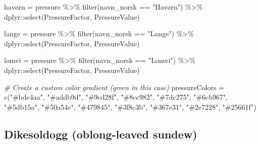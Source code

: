 \documentclass[
]{book}
\newenvironment{Shaded}{\begin{snugshade}}{\end{snugshade}}
\newcommand{\AttributeTok}[1]{\textcolor[rgb]{0.77,0.63,0.00}{#1}}
\newcommand{\CommentTok}[1]{\textcolor[rgb]{0.56,0.35,0.01}{\textit{#1}}}
\newcommand{\ConstantTok}[1]{\textcolor[rgb]{0.00,0.00,0.00}{#1}}
\newcommand{\DecValTok}[1]{\textcolor[rgb]{0.00,0.00,0.81}{#1}}
\newcommand{\FloatTok}[1]{\textcolor[rgb]{0.00,0.00,0.81}{#1}}
\newcommand{\FunctionTok}[1]{\textcolor[rgb]{0.00,0.00,0.00}{#1}}
\newcommand{\NormalTok}[1]{#1}
\newcommand{\OtherTok}[1]{\textcolor[rgb]{0.56,0.35,0.01}{#1}}
\newcommand{\SpecialCharTok}[1]{\textcolor[rgb]{0.00,0.00,0.00}{#1}}
\newcommand{\StringTok}[1]{\textcolor[rgb]{0.31,0.60,0.02}{#1}}
\begin{document}
\begin{Shaded}
\begin{Highlighting}[]
\NormalTok{havørn }\OtherTok{=}\NormalTok{ pressure }\SpecialCharTok{\%\textgreater{}\%} \FunctionTok{filter}\NormalTok{(navn\_norsk }\SpecialCharTok{==} \StringTok{"Havørn"}\NormalTok{) }\SpecialCharTok{\%\textgreater{}\%}\NormalTok{ dplyr}\SpecialCharTok{::}\FunctionTok{select}\NormalTok{(PressureFactor, PressureValue)}

\NormalTok{lange }\OtherTok{=}\NormalTok{ pressure }\SpecialCharTok{\%\textgreater{}\%} \FunctionTok{filter}\NormalTok{(navn\_norsk }\SpecialCharTok{==} \StringTok{"Lange"}\NormalTok{) }\SpecialCharTok{\%\textgreater{}\%}\NormalTok{ dplyr}\SpecialCharTok{::}\FunctionTok{select}\NormalTok{(PressureFactor, PressureValue)}

\NormalTok{lomvi }\OtherTok{=}\NormalTok{ pressure }\SpecialCharTok{\%\textgreater{}\%} \FunctionTok{filter}\NormalTok{(navn\_norsk }\SpecialCharTok{==} \StringTok{"Lomvi"}\NormalTok{) }\SpecialCharTok{\%\textgreater{}\%}\NormalTok{ dplyr}\SpecialCharTok{::}\FunctionTok{select}\NormalTok{(PressureFactor, PressureValue)}

\CommentTok{\# Create a custom color gradient (green in this case)}
\NormalTok{pressureColors }\OtherTok{=} \FunctionTok{c}\NormalTok{(}\StringTok{"\#bde4aa"}\NormalTok{, }\StringTok{"\#addb9d"}\NormalTok{, }\StringTok{"\#9cd28f"}\NormalTok{, }\StringTok{"\#8cc982"}\NormalTok{, }\StringTok{"\#7dc275"}\NormalTok{, }\StringTok{"\#6cb967"}\NormalTok{, }\StringTok{"\#5db15a"}\NormalTok{, }\StringTok{"\#50a54e"}\NormalTok{, }\StringTok{"\#479845"}\NormalTok{, }\StringTok{"\#3f8c3b"}\NormalTok{, }\StringTok{"\#367e31"}\NormalTok{, }\StringTok{"\#2e7228"}\NormalTok{, }\StringTok{"\#25661f"}\NormalTok{) }
\end{Highlighting}
\end{Shaded}

\hypertarget{dikesoldogg-oblong-leaved-sundew}{%
\subsection{Dikesoldogg (oblong-leaved sundew)}\label{dikesoldogg-oblong-leaved-sundew}}

\begin{Shaded}
\end{Shaded}
\end{document}
